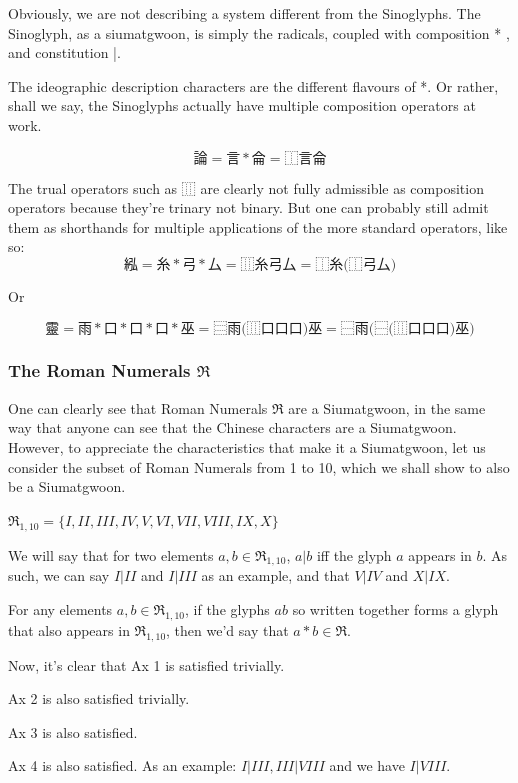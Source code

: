 Obviously, we are not describing a system different from the Sinoglyphs. The Sinoglyph, as a siumatgwoon, is simply the radicals, coupled with composition * , and constitution |. 

The ideographic description characters are the different flavours of *. Or rather, shall we say, the Sinoglyphs actually have multiple composition operators at work. 

$$\text{論}=\text{言}*\text{侖}=\text{⿰言侖}$$

The trual operators such as ⿲ are clearly not fully admissible as composition operators because they're trinary not binary. But one can probably still admit them as shorthands for multiple applications of the more standard operators, like so:
$$\text{紭}=\text{糸}*\text{弓}*\text{厶}=\text{⿲糸弓厶}=\text{⿰糸(⿰弓厶)}$$

Or 

$$\text{靈}=\text{雨}*\text{口}*\text{口}*\text{口}*\text{巫}=\text{⿳雨(⿲口口口)巫}=
\text{⿱雨(⿱(⿲口口口)巫)}$$


\subsubsection{The Roman Numerals $\mathfrak{R}$}

One can clearly see that Roman Numerals $\mathfrak{R}$ are a Siumatgwoon, in the same way that anyone can see that the Chinese characters are a Siumatgwoon. However, to appreciate the characteristics that make it a Siumatgwoon, let us consider the subset of Roman Numerals from 1 to 10, which we shall show to also be a Siumatgwoon.

$\mathfrak{R}_{1,10} = \{I, II, III, IV, V, VI, VII, VIII, IX, X\}$

We will say that for two elements $a,b \in \mathfrak{R}_{1,10}$, $a|b$ iff the glyph $a$ appears in $b$. As such, we can say $I | II$ and $I|III$ as an example, and that $V|IV$ and $X|IX$. 

For any elements $a,b\in \mathfrak{R}_{1,10}$, if the glyphs $ab$ so written together forms a glyph that also appears in $\mathfrak{R}_{1,10}$, then we'd say that $a*b\in \mathfrak{R}$.

Now, it's clear that Ax 1 is satisfied trivially. 

Ax 2 is also satisfied trivially.

Ax 3 is also satisfied. 

Ax 4 is also satisfied. As an example: $I | III, III | VIII$ and we have $I|VIII$.

